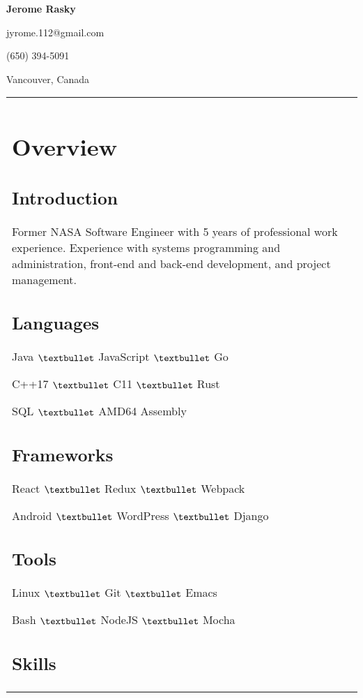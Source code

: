 \documentclass[letterpaper]{article}
\newlength{\leftcol}
\newlength{\rightcol}
\begin{document}
\bodyfont
\large
{}

{\fontsize{32pt}{32pt}\bfseries\headingfont Jerome Rasky}

\vspace*{.5\baselineskip}

jyrome.112@gmail.com

(650) 394-5091

Vancouver, Canada

\begin{tabularx}{\textwidth}{@{}p{\leftcol} p{\rightcol}}
\raggedright
\section*{Overview}
\subsection*{Introduction}

Former NASA Software Engineer with 5 years of professional work experience.
Experience with systems programming and administration, front-end and back-end
development, and project management.

\subsection*{Languages}

Java $\textbullet$ JavaScript $\textbullet$ Go

C++17 $\textbullet$ C11 $\textbullet$ Rust

SQL $\textbullet$ AMD64 Assembly

\subsection*{Frameworks}

React $\textbullet$ Redux $\textbullet$ Webpack

Android $\textbullet$ WordPress $\textbullet$ Django

\subsection*{Tools}

Linux $\textbullet$ Git $\textbullet$ Emacs

Bash $\textbullet$ NodeJS $\textbullet$ Mocha

\subsection*{Skills}


\end{tabularx}
\end{document}
